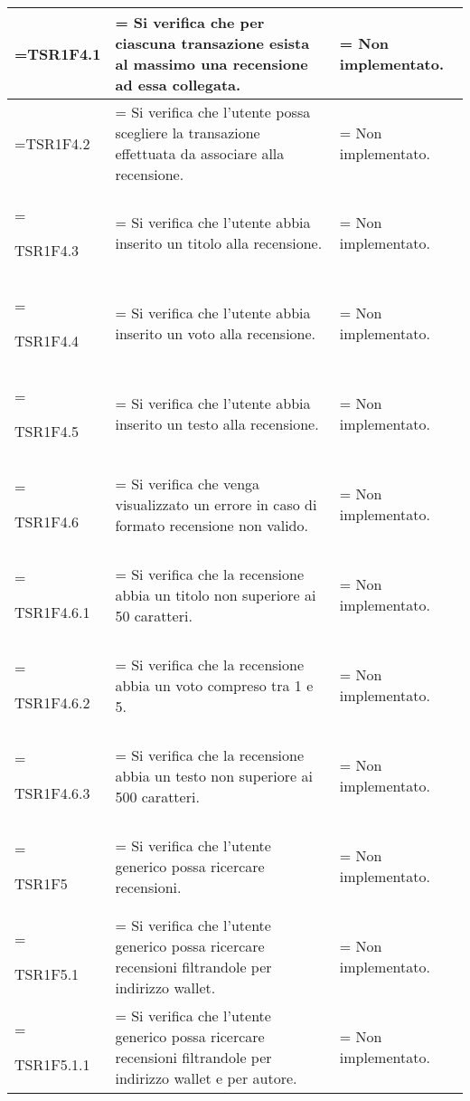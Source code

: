 \begin{xltabular}{\textwidth} {
            >{\hsize\linewidth=\hsize}X
            >{\hsize\linewidth=\hsize}X
            >{\hsize\linewidth=\hsize}X
        }
        TSR1F4.1&
        Si verifica che per ciascuna transazione esista al massimo una recensione ad essa collegata.&
        Non implementato.
        \\ \hline
        
        TSR1F4.2&
        Si verifica che l'utente possa scegliere la transazione effettuata da associare alla recensione.&
        Non implementato.
        \\ \hline

        TSR1F4.3&
        Si verifica che l'utente abbia inserito un titolo alla recensione.&
        Non implementato.
        \\ \hline

        TSR1F4.4&
        Si verifica che l'utente abbia inserito un voto alla recensione.&
        Non implementato.
        \\ \hline

        TSR1F4.5&
        Si verifica che l'utente abbia inserito un testo alla recensione.&
        Non implementato.
        \\ \hline

        TSR1F4.6&
        Si verifica che venga visualizzato un errore in caso di formato recensione non valido.&
        Non implementato.
        \\ \hline
        
        TSR1F4.6.1&
        Si verifica che la recensione abbia un titolo non superiore ai 50 caratteri.&
        Non implementato.
        \\ \hline

        TSR1F4.6.2&
        Si verifica che la recensione abbia un voto compreso tra 1 e 5.&
        Non implementato.
        \\ \hline

        TSR1F4.6.3&
        Si verifica che la recensione abbia un testo non superiore ai 500 caratteri.&
        Non implementato.
        \\ \hline

        TSR1F5&
        Si verifica che l'utente generico possa ricercare recensioni.&
        Non implementato.
        \\ \hline

        TSR1F5.1&
        Si verifica che l'utente generico possa ricercare recensioni filtrandole per indirizzo wallet.&
        Non implementato.
        \\ \hline
        
        TSR1F5.1.1&
        Si verifica che l'utente generico possa ricercare recensioni filtrandole per indirizzo wallet e per autore.&
        Non implementato.
        \\ \hline
        

\end{xltabular}

